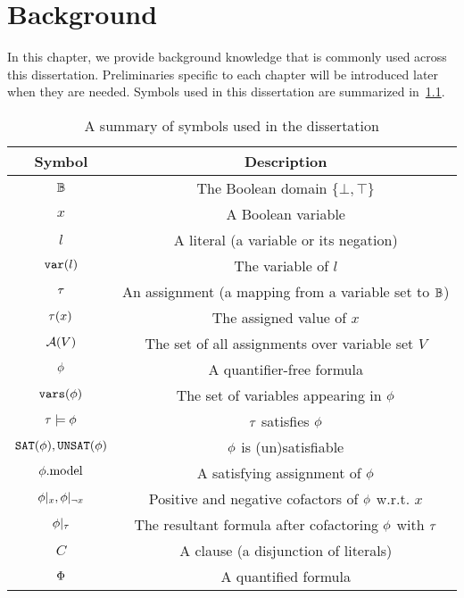 \chapter{Background}
\label{chap:background}

In this chapter, we provide background knowledge that is commonly used across this dissertation.
Preliminaries specific to each chapter will be introduced later when they are needed.
Symbols used in this dissertation are summarized in~\cref{tbl:symbols}.

\begin{table}[t]
    \centering
    \caption{A summary of symbols used in the dissertation}
    \label{tbl:symbols}
    \begin{tabular}{c|c}
        Symbol                      & Description                                                 \\
        \hline
        $\mathbb{B}$                  & The Boolean domain $\{\bot,\top\}$                          \\
        $x$                         & A Boolean variable                                          \\
        $l$                         & A literal (a variable or its negation)                      \\
        $\mathtt{var}(l)$                    & The variable of $l$                                         \\
        $\tau$                       & An assignment (a mapping from a variable set to $\mathbb{B}$) \\
        $\tau(x)$                    & The assigned value of $x$                                   \\
        $\mathcal{A}(V)$                    & The set of all assignments over variable set $V$            \\
        $\phi$                       & A quantifier-free formula                                   \\
        $\mathtt{vars}(\phi)$                  & The set of variables appearing in $\phi$                     \\
        $\tau\models\phi$             & $\tau$ satisfies $\phi$                                       \\
        $\mathtt{SAT}(\phi),\mathtt{UNSAT}(\phi)$     & $\phi$ is (un)satisfiable                                    \\
        $\phi.\mathrm{model}$               & A satisfying assignment of $\phi$                            \\
        $\phi|_{x},\phi|_{\lnot x}$ & Positive and negative cofactors of $\phi$ w.r.t. $x$         \\
        $\phi|_{\tau}$            & The resultant formula after cofactoring $\phi$ with $\tau$    \\
        $C$                         & A clause (a disjunction of literals)                        \\
        $\Phi$                       & A quantified formula                                        \\
    \end{tabular}
\end{table}




